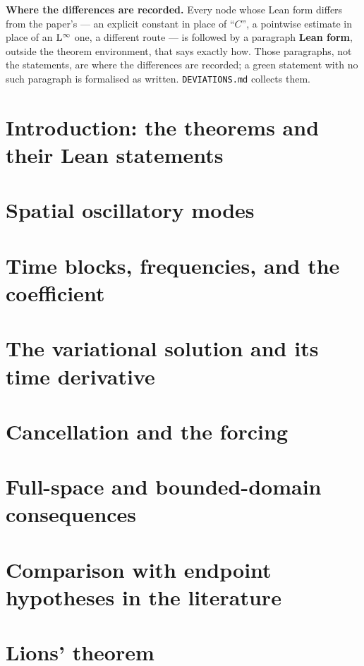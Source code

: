 \textbf{Where the differences are recorded.}  Every node whose Lean form differs from the
paper's --- an explicit constant in place of ``$C$'', a pointwise estimate in place of an
$\mathrm{L}^\infty$ one, a different route --- is followed by a paragraph \textbf{Lean form}, outside
the theorem environment, that says exactly how.  Those paragraphs, not the statements, are where
the differences are recorded; a green statement with no such paragraph is formalised as written.
\texttt{DEVIATIONS.md} collects them.

\chapter{Introduction: the theorems and their Lean statements}


\chapter{Spatial oscillatory modes}


\chapter{Time blocks, frequencies, and the coefficient}


\chapter{The variational solution and its time derivative}


\chapter{Cancellation and the forcing}


\chapter{Full-space and bounded-domain consequences}


\chapter{Comparison with endpoint hypotheses in the literature}


\chapter{Lions' theorem}

